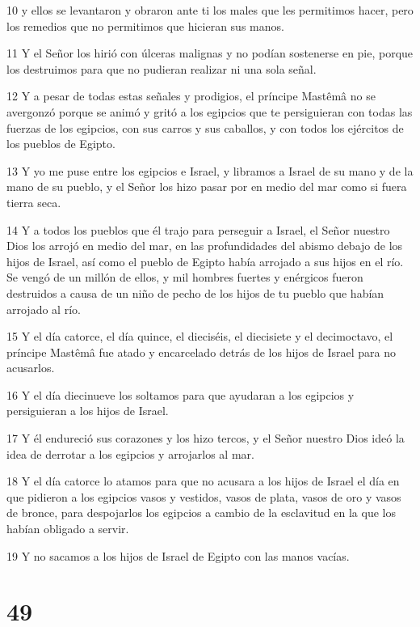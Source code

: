 \par 10 y ellos se levantaron y obraron ante ti los males que les permitimos hacer, pero los remedios que no permitimos que hicieran sus manos.
\par 11 Y el Señor los hirió con úlceras malignas y no podían sostenerse en pie, porque los destruimos para que no pudieran realizar ni una sola señal.
\par 12 Y a pesar de todas estas señales y prodigios, el príncipe Mastêmâ no se avergonzó porque se animó y gritó a los egipcios que te persiguieran con todas las fuerzas de los egipcios, con sus carros y sus caballos, y con todos los ejércitos de los pueblos de Egipto.
\par 13 Y yo me puse entre los egipcios e Israel, y libramos a Israel de su mano y de la mano de su pueblo, y el Señor los hizo pasar por en medio del mar como si fuera tierra seca.
\par 14 Y a todos los pueblos que él trajo para perseguir a Israel, el Señor nuestro Dios los arrojó en medio del mar, en las profundidades del abismo debajo de los hijos de Israel, así como el pueblo de Egipto había arrojado a sus hijos en el río. Se vengó de un millón de ellos, y mil hombres fuertes y enérgicos fueron destruidos a causa de un niño de pecho de los hijos de tu pueblo que habían arrojado al río.
\par 15 Y el día catorce, el día quince, el dieciséis, el diecisiete y el decimoctavo, el príncipe Mastêmâ fue atado y encarcelado detrás de los hijos de Israel para no acusarlos.
\par 16 Y el día diecinueve los soltamos para que ayudaran a los egipcios y persiguieran a los hijos de Israel.
\par 17 Y él endureció sus corazones y los hizo tercos, y el Señor nuestro Dios ideó la idea de derrotar a los egipcios y arrojarlos al mar.
\par 18 Y el día catorce lo atamos para que no acusara a los hijos de Israel el día en que pidieron a los egipcios vasos y vestidos, vasos de plata, vasos de oro y vasos de bronce, para despojarlos los egipcios a cambio de la esclavitud en la que los habían obligado a servir.
\par 19 Y no sacamos a los hijos de Israel de Egipto con las manos vacías.

\chapter{49}


